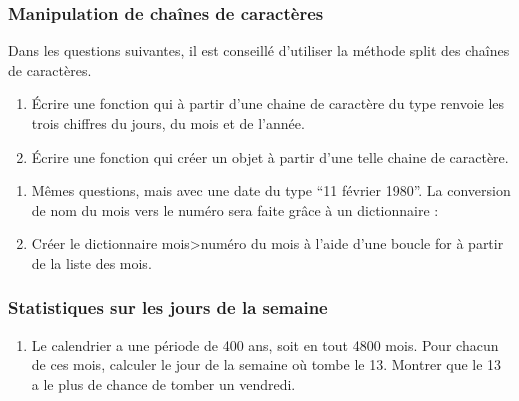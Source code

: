 \documentclass[letterpaper,10pt,english]{sphinxhowto}
\begin{document}
\subsubsection{Manipulation de chaînes de caractères}
\label{\detokenize{devoir_maison_Devoir Maison:manipulation-de-chaines-de-caracteres}}
\sphinxAtStartPar
Dans les questions suivantes, il est conseillé d’utiliser la méthode split des chaînes de caractères.
\begin{enumerate}
%
\setcounter{enumi}{10}
\item {} 
\sphinxAtStartPar
Écrire une fonction qui à partir d’une chaine de caractère du type  renvoie les trois chiffres du jours, du mois et de l’année.

\item {} 
\sphinxAtStartPar
Écrire une fonction qui créer un objet  à partir d’une telle chaine de caractère.

\end{enumerate}
\begin{enumerate}
%
\setcounter{enumi}{12}
\item {} 
\sphinxAtStartPar
Mêmes questions, mais avec une date du type “11 février 1980”. La conversion de nom du mois vers le numéro sera faite grâce à un dictionnaire : 

\item {} 
\sphinxAtStartPar
Créer le dictionnaire mois\sphinxhyphen{}>numéro du mois à l’aide d’une boucle for à partir de la liste des mois.

\end{enumerate}


\subsubsection{Statistiques sur les jours de la semaine}
\label{\detokenize{devoir_maison_Devoir Maison:statistiques-sur-les-jours-de-la-semaine}}\begin{enumerate}
%
\setcounter{enumi}{14}
\item {} 
\sphinxAtStartPar
Le calendrier a une période de 400 ans, soit en tout 4800 mois. Pour chacun de ces mois, calculer le jour de la semaine où tombe le 13. Montrer que le 13 a le plus de chance de tomber un vendredi.

\end{enumerate}
\end{document}
